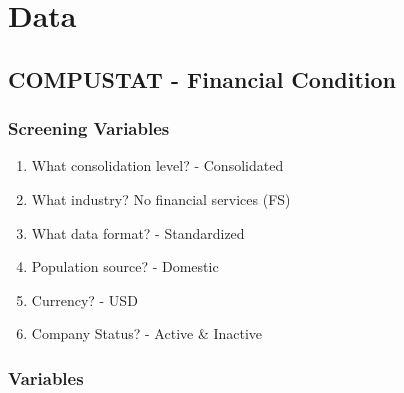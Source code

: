 \documentclass[12pt]{article}
\begin{document}
\section{Data}

    \subsection{COMPUSTAT - Financial Condition}

        \subsubsection{Screening Variables}

        \begin{enumerate}
            \item What consolidation level? - Consolidated
            \item What industry? No financial services (FS) 
            \item What data format?  - Standardized 
            \item Population source? - Domestic 
            \item Currency? - USD 
            \item Company Status? - Active \& Inactive  
        \end{enumerate}

        \subsubsection{Variables}
\end{document}

